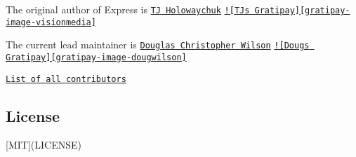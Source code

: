 The original author of Express is \href{https://github.com/tj}{\tt T\+J Holowaychuk} \href{https://gratipay.com/visionmedia/}{\tt !\mbox{[}T\+J\textquotesingle{}s Gratipay\mbox{]}\mbox{[}gratipay-\/image-\/visionmedia\mbox{]}}

The current lead maintainer is \href{https://github.com/dougwilson}{\tt Douglas Christopher Wilson} \href{https://gratipay.com/dougwilson/}{\tt !\mbox{[}Doug\textquotesingle{}s Gratipay\mbox{]}\mbox{[}gratipay-\/image-\/dougwilson\mbox{]}}

\href{https://github.com/strongloop/express/graphs/contributors}{\tt List of all contributors}

\subsection*{License}

\mbox{[}M\+I\+T\mbox{]}(L\+I\+C\+E\+N\+S\+E) 